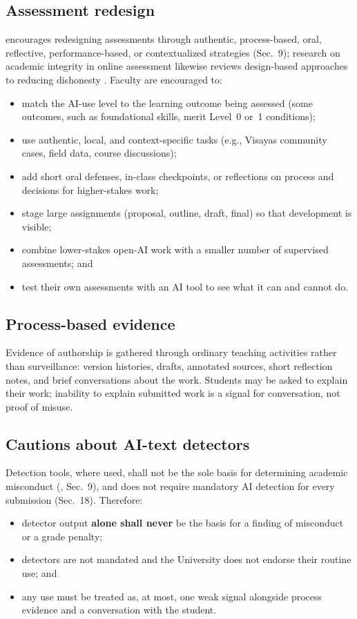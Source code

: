 \subsection{Assessment redesign}
\cmo{} encourages redesigning assessments through authentic, process-based, oral, reflective, performance-based, or contextualized strategies (Sec.~9); research on academic integrity in online assessment likewise reviews design-based approaches to reducing dishonesty \citep{holden2021}. Faculty are encouraged to:
\begin{itemize}
  \item match the AI-use level to the learning outcome being assessed (some outcomes, such as foundational skills, merit Level~0 or~1 conditions);
  \item use authentic, local, and context-specific tasks (e.g., Visayas community cases, field data, course discussions);
  \item add short oral defenses, in-class checkpoints, or reflections on process and decisions for higher-stakes work;
  \item stage large assignments (proposal, outline, draft, final) so that development is visible;
  \item combine lower-stakes open-AI work with a smaller number of supervised assessments; and
  \item test their own assessments with an AI tool to see what it can and cannot do.
\end{itemize}

\subsection{Process-based evidence}
Evidence of authorship is gathered through ordinary teaching activities rather than surveillance: version histories, drafts, annotated sources, short reflection notes, and brief conversations about the work. Students may be asked to explain their work; inability to explain submitted work is a signal for conversation, not proof of misuse.

\subsection{Cautions about AI-text detectors}
Detection tools, where used, shall not be the sole basis for determining academic misconduct (\cmo{}, Sec.~9), and \cmo{} does not require mandatory AI detection for every submission (Sec.~18). Therefore:
\begin{itemize}
  \item detector output \textbf{alone shall never} be the basis for a finding of misconduct or a grade penalty;
  \item detectors are not mandated and the University does not endorse their routine use; and
  \item any use must be treated as, at most, one weak signal alongside process evidence and a conversation with the student.
\end{itemize}

